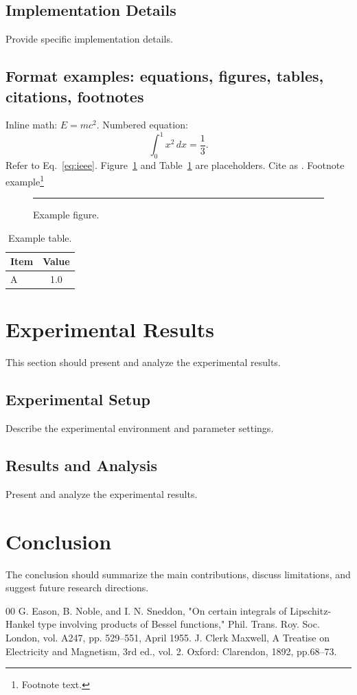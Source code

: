 \documentclass[conference]{IEEEtran}
\begin{document}
\subsection{Implementation Details}
Provide specific implementation details.

\subsection{Format examples: equations, figures, tables, citations, footnotes}
Inline math: $E=mc^2$. Numbered equation:
\begin{equation}
  \label{eq:ieee}
  \int_0^1 x^2 \, dx = \frac{1}{3}.
\end{equation}
Refer to Eq.~\ref{eq:ieee}. Figure~\ref{fig:ieee} and Table~\ref{tab:ieee} are placeholders. Cite as \cite{b1}. Footnote example\footnote{Footnote text.}
\begin{figure}[htbp]
  \centering
  \rule{3.5cm}{2cm}
  \caption{Example figure.}
  \label{fig:ieee}
\end{figure}
\begin{table}[htbp]
  \centering
  \caption{Example table.}
  \label{tab:ieee}
  \begin{tabular}{lc}
    \hline
    Item & Value \\
    \hline
    A    & 1.0   \\
    \hline
  \end{tabular}
\end{table}

\section{Experimental Results}
This section should present and analyze the experimental results.

\subsection{Experimental Setup}
Describe the experimental environment and parameter settings.

\subsection{Results and Analysis}
Present and analyze the experimental results.

\section{Conclusion}
The conclusion should summarize the main contributions, discuss limitations,
and suggest future research directions.

\begin{thebibliography}{00}
 G. Eason, B. Noble, and I. N. Sneddon, "On certain integrals of
Lipschitz-Hankel type involving products of Bessel functions," Phil. Trans. Roy. Soc. London, vol. A247, pp. 529--551, April 1955.
 J. Clerk Maxwell, A Treatise on Electricity and Magnetism, 3rd ed., vol. 2. Oxford: Clarendon, 1892, pp.68--73.
\end{thebibliography}
\end{document}
